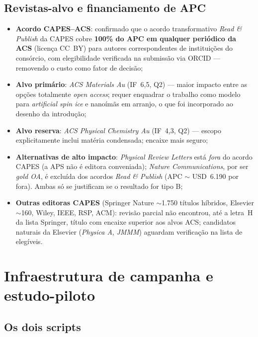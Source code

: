 \documentclass[11pt,a4paper]{article}
\begin{document}
\subsection{Revistas-alvo e financiamento de APC}

\begin{itemize}
\item \textbf{Acordo CAPES--ACS}: confirmado que o acordo transformativo
\emph{Read \& Publish} da CAPES cobre \textbf{100\% do APC em qualquer
periódico da ACS} (licença CC~BY) para autores correspondentes de
instituições do consórcio, com elegibilidade verificada na submissão via
ORCID --- removendo o custo como fator de decisão;
\item \textbf{Alvo primário}: \emph{ACS Materials Au} (IF~6{,}5, Q2) ---
maior impacto entre as opções totalmente \emph{open access}; requer
enquadrar o trabalho como modelo para \emph{artificial spin ice} e
nanoímãs em arranjo, o que foi incorporado ao desenho da introdução;
\item \textbf{Alvo reserva}: \emph{ACS Physical Chemistry Au} (IF~4{,}3,
Q2) --- escopo explicitamente inclui matéria condensada; encaixe mais
seguro;
\item \textbf{Alternativas de alto impacto}: \emph{Physical Review
Letters} está \emph{fora} do acordo CAPES (a APS não é editora
conveniada); \emph{Nature Communications}, por ser \emph{gold OA}, é
excluída dos acordos \emph{Read \& Publish} (APC $\sim$ USD~6.190 por
fora). Ambas só se justificam se o resultado for tipo B;
\item \textbf{Outras editoras CAPES} (Springer Nature $\sim$1.750
títulos híbridos, Elsevier $\sim$160, Wiley, IEEE, RSP, ACM): revisão
parcial não encontrou, até a letra~H da lista Springer, título com
encaixe superior aos alvos ACS; candidatos naturais da Elsevier
(\emph{Physica A}, \emph{JMMM}) aguardam verificação na lista de
elegíveis.
\end{itemize}

\section{Infraestrutura de campanha e estudo-piloto}
\label{sec:campanha}

\subsection{Os dois scripts}
\end{document}
